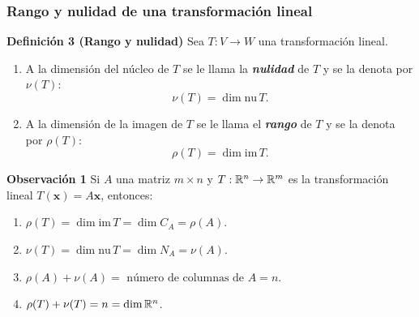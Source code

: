 {\nologo
\begin{frame}\frametitle{Rango y nulidad de una transformación lineal}

\vspace{-2mm}
\begin{defi}{\textbf{Definición 3 (Rango y nulidad)}}\justifying
	Sea $T:V\to W$ una transformación lineal.
	\begin{enumerate}
		\item[\labelname{$a$}] A la dimensión del núcleo de $T$ se le llama la \textbf{\textit{nulidad}} de $T$ 
		y se la denota por $\nu(T)$:
		\[
			\nu(T) = \dim \text{nu}\, T.
		\]
		\item[\labelname{$b$}] A la dimensión de la imagen de $T$ se le llama el \textbf{\textit{rango}} de $T$ 
		y se la denota por $\rho(T)$:
		\[
		\rho(T) = \dim \text{im}\, T.
		\]
	\end{enumerate}
\end{defi}	

\begin{alertblock}{\textbf{Observación 1}}\justifying
	Si $A$ una matriz $m\times n$ y $T:\mathbb{R}^n\to \mathbb{R}^m$ es la transformación lineal $T(\mathbf{x})=A\mathbf{x}$, entonces:
	\begin{enumerate}
		\item[\labelname{$a$}] $\rho(T) = \dim \text{im}\, T = \dim C_A = \rho(A)$.
		\item[\labelname{$b$}] $\nu(T) = \dim \text{nu}\, T = \dim N_A = \nu(A)$.
		\item[\labelname{$c$}] $\rho(A) + \nu(A) = \text{ número de columnas de } A = n$.
		\item[\labelname{$d$}] $\rho(T) + \nu(T) = n = \dim \mathbb{R}^n$.
	\end{enumerate}

\end{alertblock}

\end{frame}
}

\subsection{}

